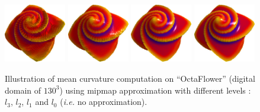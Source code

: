 \documentclass{llncs}
\newcommand{\ie}{\emph{i.e.} }
\begin{document}
\begin{figure}[!htbp]
  \vspace{-0.35cm}
  \begin{center}
   {\includegraphics[width=2.7cm]{figs/octa_r10_l3_a}}
   {\includegraphics[width=2.7cm]{figs/octa_r10_l2_a}}
   {\includegraphics[width=2.7cm]{figs/octa_r10_l1_a}}
   {\includegraphics[width=2.7cm]{figs/octa_r10_l0_a}}
  \end{center}
  \vspace{-0.35cm}
  \caption{Illustration of mean curvature computation on ``OctaFlower'' (digital domain of $130^3$) using mipmap approximation with different levels : $l_3$, $l_2$, $l_1$ and $l_0$ (\ie no approximation).
  }
  \label{fig:refine}
  \vspace{-0.35cm}
\end{figure}
\end{document}
